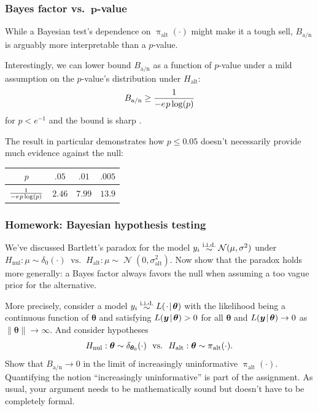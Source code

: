 \documentclass[18pt]{beamer}
\newcommand{\defineTightSpacing}{%
	\setlength{\abovedisplayskip}{.25\baselineskip}%
	\setlength{\belowdisplayskip}{.25\baselineskip}%
}
\newcommand{\given}{\mskip.7\thinmuskip | \mskip.7\thinmuskip}
\newcommand{\thinnerspace}{\mskip.5\thinmuskip}
\newcommand{\iidSim}{\mathrel{\raisebox{-.3ex}{$\overset{\text{i.i.d.}}{\sim}$}}}
\newcommand{\normalDist}{\operatorname{\mathcal{N}}}
\newcommand{\density}{\operatorname{\pi}}
\newcommand{\likelihood}{L}
\newcommand{\by}{\bm{y}}
\newcommand{\btheta}{\bm{\theta}}
\newcommand{\hypothesis}{H}
\newcommand{\nullSub}{\mathrm{nul}}
\newcommand{\altSub}{\mathrm{alt}}
\newcommand{\bayesFacAlt}{B_{\mathrm{a} / \mathrm{n}}}
\begin{document}
\begin{frame}
\frametitle{Bayes factor vs.\ $\bm{p}$-value}
While a Bayesian test's dependence on $\density_\altSub(\cdot)$ might make it a tough sell, $\bayesFacAlt$ is arguably more interpretable than a $p$-value.

\pause
Interestingly, we can lower bound $\bayesFacAlt$ as a function of $p$-value under a mild assumption on the $p$-value's distribution under $\hypothesis_\altSub$:
\begin{equation*} \defineTightSpacing%
\bayesFacAlt
	\geq \frac{1}{- e \thinnerspace p \log(p)}
\end{equation*}
for $p < e^{-1}$ and the bound is sharp \citep{sellke2001pval_calibration}.

\pause
The result in particular demonstrates how $p \leq 0.05$ doesn't necessarily provide much evidence against the null:
\vspace*{-.5\baselineskip}
\begin{center}
\begin{tabular}{c|c|c|c} 
$p$ & $.05$ & $.01$ & $.005$ \\ 
 \hline
$\frac{1}{- e \thinnerspace p \log(p)}$ & $2.46$ & $7.99$ & $13.9$
\end{tabular}
\end{center}
\end{frame}


\begin{frame}
\frametitle{Homework: Bayesian hypothesis testing}
We've discussed Bartlett's paradox for the model $y_i \iidSim \normalDist(\mu, \sigma^2)$ under 
$\hypothesis_\nullSub: \mu \sim \delta_0(\cdot) 
	\ \text{ vs.\ } \ 
	\hypothesis_\altSub: \mu \sim \normalDist(0, \sigma_\altSub^2)$.
Now show that the paradox holds more generally: a Bayes factor always favors the null when assuming a too vague prior for the alternative.

More precisely, consider a model $y_i \iidSim \likelihood(\thinnerspace \cdot \given \btheta)$ with the likelihood being a continuous function of $\btheta$ and satisfying $\likelihood(\by \given \btheta) > 0$ for all $\btheta$ and $\likelihood(\by \given \btheta) \to 0$ as $\| \btheta \| \to \infty$.
And consider hypotheses
\begin{equation*} \defineTightSpacing%
\hypothesis_\nullSub: \btheta \sim \delta_{\btheta_0}(\cdot) 
	\ \text{ vs.\ } \ 
\hypothesis_\altSub: \btheta \sim \density_\altSub(\cdot).
\end{equation*}
Show that $\bayesFacAlt \to 0$ in the limit of increasingly uninformative $\density_\altSub(\cdot)$.
Quantifying the notion ``increasingly uninformative'' is part of the assignment.
As usual, your argument needs to be mathematically sound but doesn't have to be completely formal.
\end{frame}
\end{document}
